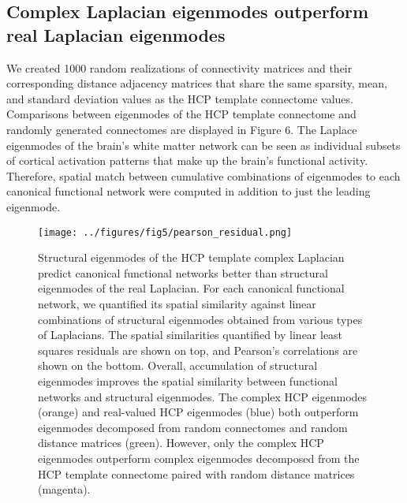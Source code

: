 \documentclass{article}
\begin{document}

\subsection{Complex Laplacian eigenmodes outperform real Laplacian eigenmodes}
We created 1000 random realizations of connectivity matrices and their corresponding distance adjacency matrices that share the same sparsity, mean, and standard deviation values as the HCP template connectome values. Comparisons between eigenmodes of the HCP template connectome and randomly generated connectomes are displayed in Figure 6. The Laplace eigenmodes of the brain's white matter network can be seen as individual subsets of cortical activation patterns that make up the brain's functional activity. Therefore, spatial match between cumulative combinations of eigenmodes to each canonical functional network were computed in addition to just the leading eigenmode. 

\begin{figure}[ht]
\centering
\texttt{[image: ../figures/fig5/pearson\_residual.png]}
\caption{Structural eigenmodes of the HCP template complex Laplacian predict canonical functional networks better than structural eigenmodes of the real Laplacian. For each canonical functional network, we quantified its spatial similarity against linear combinations of structural eigenmodes obtained from various types of Laplacians. The spatial similarities quantified by linear least squares residuals are shown on top, and Pearson's correlations are shown on the bottom. Overall, accumulation of structural eigenmodes improves the spatial similarity between functional networks and structural eigenmodes. The complex HCP eigenmodes (orange) and real-valued HCP eigenmodes (blue) both outperform eigenmodes decomposed from random connectomes and random distance matrices (green). However, only the complex HCP eigenmodes outperform complex eigenmodes decomposed from the HCP template connectome paired with random distance matrices (magenta).
}
\label{fig:fig6}
\end{figure}
\end{document}
